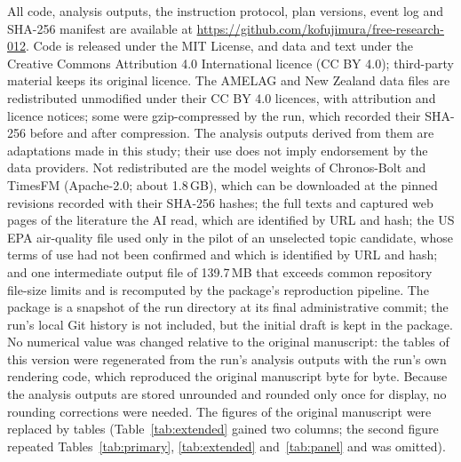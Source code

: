 \documentclass[11pt]{article}
\begin{document}
All code, analysis outputs, the instruction protocol, plan versions, event log and SHA-256 manifest are available at \url{https://github.com/kofujimura/free-research-012}. Code is released under the MIT License, and data and text under the Creative Commons Attribution 4.0 International licence (CC BY 4.0); third-party material keeps its original licence. The AMELAG and New Zealand data files are redistributed unmodified under their CC BY 4.0 licences, with attribution and licence notices; some were gzip-compressed by the run, which recorded their SHA-256 before and after compression. The analysis outputs derived from them are adaptations made in this study; their use does not imply endorsement by the data providers. Not redistributed are the model weights of Chronos-Bolt and TimesFM (Apache-2.0; about 1.8\,GB), which can be downloaded at the pinned revisions recorded with their SHA-256 hashes; the full texts and captured web pages of the literature the AI read, which are identified by URL and hash; the US EPA air-quality file used only in the pilot of an unselected topic candidate, whose terms of use had not been confirmed and which is identified by URL and hash; and one intermediate output file of 139.7\,MB that exceeds common repository file-size limits and is recomputed by the package's reproduction pipeline. The package is a snapshot of the run directory at its final administrative commit; the run's local Git history is not included, but the initial draft is kept in the package. No numerical value was changed relative to the original manuscript: the tables of this version were regenerated from the run's analysis outputs with the run's own rendering code, which reproduced the original manuscript byte for byte. Because the analysis outputs are stored unrounded and rounded only once for display, no rounding corrections were needed. The figures of the original manuscript were replaced by tables (Table~\ref{tab:extended} gained two columns; the second figure repeated Tables~\ref{tab:primary}, \ref{tab:extended} and~\ref{tab:panel} and was omitted).
\end{document}
